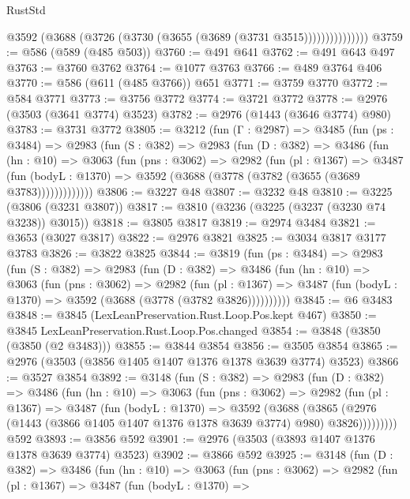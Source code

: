 \begin{lexlean}{RustStd}
\begin{coremodule}
                    @3592 (@3688 (@3726 (@3730 (@3655 (@3689 (@3731 @3515)))))))))))))))
@3759 := @586 (@589 (@485 @503))
@3760 := @491 @641
@3762 := @491 @643 @497
@3763 := @3760 @3762
@3764 := @1077 @3763
@3766 := @489 @3764 @406
@3770 := @586 (@611 (@485 @3766)) @651
@3771 := @3759 @3770
@3772 := @584 @3771
@3773 := @3756 @3772
@3774 := @3721 @3772
@3778 := @2976 (@3503 (@3641 @3774) @3523)
@3782 := @2976 (@1443 (@3646 @3774) @980)
@3783 := @3731 @3772
@3805 := @3212
    (fun (Γ : @2987) =>
    @3485
      (fun (ps : @3484) =>
      @2983
        (fun (S : @382) =>
        @2983
          (fun (D : @382) =>
          @3486
            (fun (hn : @10) =>
            @3063
              (fun (pns : @3062) =>
              @2982
                (fun (pl : @1367) =>
                @3487
                  (fun (bodyL : @1370) =>
                  @3592 (@3688 (@3778 (@3782 (@3655 (@3689 @3783)))))))))))))
@3806 := @3227 @48
@3807 := @3232 @48
@3810 := @3225 (@3806 (@3231 @3807))
@3817 := @3810 (@3236 (@3225 (@3237 (@3230 @74 @3238)) @3015))
@3818 := @3805 @3817
@3819 := @2974 @3484
@3821 := @3653 (@3027 @3817)
@3822 := @2976 @3821
@3825 := @3034 @3817 @3177 @3783
@3826 := @3822 @3825
@3844 := @3819
    (fun (ps : @3484) =>
    @2983
      (fun (S : @382) =>
      @2983
        (fun (D : @382) =>
        @3486
          (fun (hn : @10) =>
          @3063
            (fun (pns : @3062) =>
            @2982
              (fun (pl : @1367) =>
              @3487 (fun (bodyL : @1370) => @3592 (@3688 (@3778 (@3782 @3826))))))))))
@3845 := @6 @3483
@3848 := @3845 (LexLeanPreservation.Rust.Loop.Pos.kept @467)
@3850 := @3845 LexLeanPreservation.Rust.Loop.Pos.changed
@3854 := @3848 (@3850 (@3850 (@2 @3483)))
@3855 := @3844 @3854
@3856 := @3505 @3854
@3865 := @2976 (@3503 (@3856 @1405 @1407 @1376 @1378 @3639 @3774) @3523)
@3866 := @3527 @3854
@3892 := @3148
    (fun (S : @382) =>
    @2983
      (fun (D : @382) =>
      @3486
        (fun (hn : @10) =>
        @3063
          (fun (pns : @3062) =>
          @2982
            (fun (pl : @1367) =>
            @3487
              (fun (bodyL : @1370) =>
              @3592
                (@3688
                  (@3865
                    (@2976 (@1443 (@3866 @1405 @1407 @1376 @1378 @3639 @3774) @980) @3826)))))))))
    @592
@3893 := @3856 @592
@3901 := @2976 (@3503 (@3893 @1407 @1376 @1378 @3639 @3774) @3523)
@3902 := @3866 @592
@3925 := @3148
    (fun (D : @382) =>
    @3486
      (fun (hn : @10) =>
      @3063
        (fun (pns : @3062) =>
        @2982
          (fun (pl : @1367) =>
          @3487
            (fun (bodyL : @1370) =>

\end{coremodule}
\end{lexlean}
